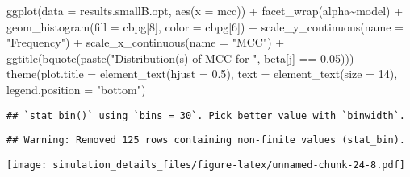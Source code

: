 \documentclass[
]{article}
\newenvironment{Shaded}{\begin{snugshade}}{\end{snugshade}}
\newcommand{\AttributeTok}[1]{\textcolor[rgb]{0.77,0.63,0.00}{#1}}
\newcommand{\DecValTok}[1]{\textcolor[rgb]{0.00,0.00,0.81}{#1}}
\newcommand{\FloatTok}[1]{\textcolor[rgb]{0.00,0.00,0.81}{#1}}
\newcommand{\FunctionTok}[1]{\textcolor[rgb]{0.00,0.00,0.00}{#1}}
\newcommand{\NormalTok}[1]{#1}
\newcommand{\SpecialCharTok}[1]{\textcolor[rgb]{0.00,0.00,0.00}{#1}}
\newcommand{\StringTok}[1]{\textcolor[rgb]{0.31,0.60,0.02}{#1}}
\begin{document}
\begin{Shaded}
\begin{Highlighting}[]
\FunctionTok{ggplot}\NormalTok{(}\AttributeTok{data =}\NormalTok{ results.smallB.opt,}
       \FunctionTok{aes}\NormalTok{(}\AttributeTok{x =}\NormalTok{ mcc)) }\SpecialCharTok{+}
  \FunctionTok{facet\_wrap}\NormalTok{(alpha}\SpecialCharTok{\textasciitilde{}}\NormalTok{model) }\SpecialCharTok{+}
  \FunctionTok{geom\_histogram}\NormalTok{(}\AttributeTok{fill =}\NormalTok{ cbpg[}\DecValTok{8}\NormalTok{], }\AttributeTok{color =}\NormalTok{ cbpg[}\DecValTok{6}\NormalTok{]) }\SpecialCharTok{+}
  \FunctionTok{scale\_y\_continuous}\NormalTok{(}\AttributeTok{name =} \StringTok{"Frequency"}\NormalTok{) }\SpecialCharTok{+}
  \FunctionTok{scale\_x\_continuous}\NormalTok{(}\AttributeTok{name =} \StringTok{"MCC"}\NormalTok{) }\SpecialCharTok{+}
  \FunctionTok{ggtitle}\NormalTok{(}\FunctionTok{bquote}\NormalTok{(}\FunctionTok{paste}\NormalTok{(}\StringTok{"Distribution(s) of MCC for "}\NormalTok{, beta[j] }\SpecialCharTok{==} \FloatTok{0.05}\NormalTok{))) }\SpecialCharTok{+}
  \FunctionTok{theme}\NormalTok{(}\AttributeTok{plot.title =} \FunctionTok{element\_text}\NormalTok{(}\AttributeTok{hjust =} \FloatTok{0.5}\NormalTok{), }
        \AttributeTok{text =} \FunctionTok{element\_text}\NormalTok{(}\AttributeTok{size =} \DecValTok{14}\NormalTok{),}
        \AttributeTok{legend.position =} \StringTok{"bottom"}\NormalTok{)}
\end{Highlighting}
\end{Shaded}

\begin{verbatim}
## `stat_bin()` using `bins = 30`. Pick better value with `binwidth`.
\end{verbatim}

\begin{verbatim}
## Warning: Removed 125 rows containing non-finite values (stat_bin).
\end{verbatim}

\texttt{[image: simulation\_details\_files/figure-latex/unnamed-chunk-24-8.pdf]}
\end{document}
